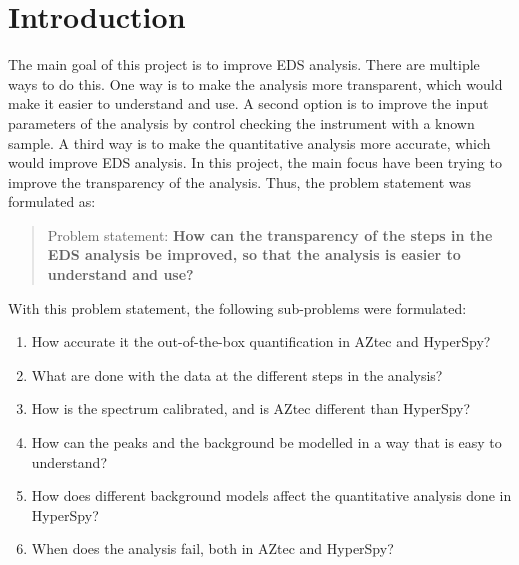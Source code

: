 \chapter{Introduction}
\label{chap:introduction}

%
%
The main goal of this project is to improve EDS analysis. There are multiple ways to do this.
One way is to make the analysis more transparent, which would make it easier to understand and use.
A second option is to improve the input parameters of the analysis by control checking the instrument with a known sample.
A third way is to make the quantitative analysis more accurate, which would improve EDS analysis.
In this project, the main focus have been trying to improve the transparency of the analysis. Thus, the problem statement was formulated as:

\begin{quote}
    Problem statement: \textbf{How can the transparency of the steps in the EDS analysis be improved, so that the analysis is easier to understand and use?
    }
\end{quote}


With this problem statement, the following sub-problems were formulated:


\begin{enumerate}
    \item How accurate it the out-of-the-box quantification in AZtec and HyperSpy?
    \item What are done with the data at the different steps in the analysis?
    \item How is the spectrum calibrated, and is AZtec different than HyperSpy?
    \item How can the peaks and the background be modelled in a way that is easy to understand?
    \item How does different background models affect the quantitative analysis done in HyperSpy?
    \item When does the analysis fail, both in AZtec and HyperSpy?
\end{enumerate}


